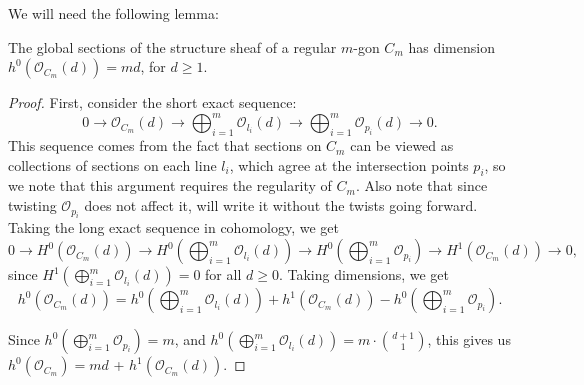 We will need the following lemma:
\begin{lemma}\label{lem:h0Oc}
    The global sections of the structure sheaf of a regular $m$-gon $C_m$ has dimension $h^0(\mathcal{O}_{C_m}(d)) = md$, for $d \geq 1$.
\end{lemma}
\begin{proof}
    First, consider the short exact sequence:
    \[0 \to \mathcal{O}_{C_m}(d) \to \bigoplus_{i=1}^m \mathcal{O}_{l_i}(d) \to \bigoplus_{i=1}^m \mathcal{O}_{p_i}(d) \to 0.\]
    This sequence comes from the fact that sections on $C_m$ can be viewed as collections of sections on each line $l_i$, which agree at the intersection points $p_i$, so we note that this argument requires the regularity of $C_m$. Also note that since twisting $\mathcal{O}_{p_i}$ does not affect it, will write it without the twists going forward. Taking the long exact sequence in cohomology, we get 
    \[0 \to H^0(\mathcal{O}_{C_m}(d)) \to H^0(\bigoplus_{i=1}^m \mathcal{O}_{l_i}(d)) \to H^0(\bigoplus_{i=1}^m \mathcal{O}_{p_i}) \to H^1(\mathcal{O}_{C_m}(d)) \to 0,\]
    since $H^1(\bigoplus_{i=1}^m \mathcal{O}_{l_i}(d)) = 0$ for all $d \geq 0$.
    Taking dimensions, we get
    \[h^0(\mathcal{O}_{C_m}(d)) = h^0(\bigoplus_{i=1}^m \mathcal{O}_{l_i}(d)) + h^1(\mathcal{O}_{C_m}(d)) - h^0(\bigoplus_{i=1}^m \mathcal{O}_{p_i}).\]

    Since $h^0(\bigoplus_{i=1}^m \mathcal{O}_{p_i}) = m$, and $h^0(\bigoplus_{i=1}^m \mathcal{O}_{l_i}(d)) = m \cdot \binom{d+1}{1}$, this gives us $h^0(\mathcal{O}_{C_m}) = md$ + $h^1(\mathcal{O}_{C_m}(d))$. 
    

\end{proof}
